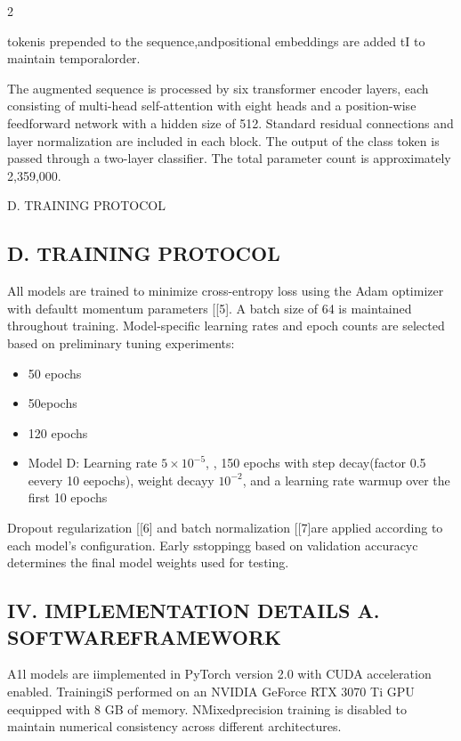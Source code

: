 \documentclass{article}
\begin{document}
\begin{paracol}{2}
\switchcolumn
\RaggedRight

tokenis prepended to the sequence,andpositional
embeddings are added tI to maintain temporalorder.


The augmented sequence is processed by six
transformer encoder layers, each consisting of
multi-head self-attention with eight heads and a
position-wise feedforward network with a hidden
size of 512. Standard residual connections and
layer normalization are included in each block.
The output of the class token is passed through a
two-layer classifier. The total parameter count is
approximately 2,359,000.


D. TRAINING PROTOCOL


\subsection*{D. TRAINING PROTOCOL}


All models are trained to minimize cross-entropy
loss using the Adam optimizer with defaultt momentum parameters [[5]. A batch size of 64
is maintained throughout training. Model-specific
learning rates and epoch counts are selected based
on preliminary tuning experiments:

\begin{itemize}
\item 50 epochs

\item 50epochs

\item 120 epochs

\item Model D: Learning rate $5\times10^{-5}$, , 150 epochs
with step decay(factor 0.5 eevery 10 eepochs),
weight decayy $10^{-2}$, and a learning rate warmup
over the first 10 epochs

\end{itemize}

Dropout regularization [[6] and batch normalization [[7]are applied according to each model's
configuration. Early sstoppingg based on validation
accuracyc determines the final model weights used
for testing.


\subsection*{IV. IMPLEMENTATION DETAILS
A. SOFTWAREFRAMEWORK}


A1l models are iimplemented in PyTorch version
2.0 with CUDA acceleration enabled. TrainingiS
performed on an NVIDIA GeForce RTX 3070 Ti
GPU eequipped with 8 GB of memory. NMixedprecision training is disabled to maintain numerical
consistency across different architectures.



\end{paracol}
\end{document}
